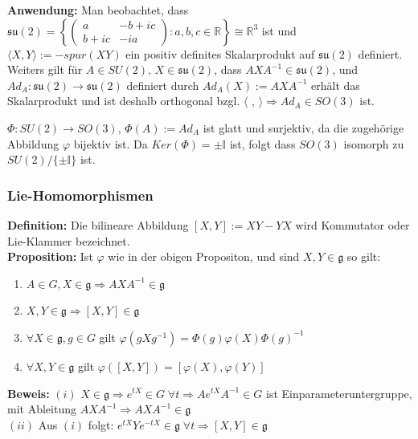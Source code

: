 \documentclass[11pt]{beamer}
\begin{document}
\begin{frame}
	\textbf{Anwendung:} 
	Man beobachtet, dass $\mathfrak{su(2)} = \left\{ \left( \begin{matrix}
	a  	& -b+ic\\
	b+ic	& -ia
	\end{matrix}\right): a,b,c \in \mathbb{R} \right\} \cong \mathbb{R}^3$ 
	ist \pause
	und 
	$\langle X, Y \rangle:= -spur(XY)$ ein positiv definites Skalarprodukt auf $\mathfrak{su(2)}$\pause 
	definiert.
	Weiters gilt für $A\in SU(2)$, $X\in \mathfrak{su(2)}$, dass $AXA^{-1} \in \mathfrak{su(2)}$,\pause
	 und 
	$Ad_A:\mathfrak{su(2)} \to \mathfrak{su(2)}$ definiert durch $Ad_A(X) := AXA^{-1}$ erhält das Skalarprodukt und ist deshalb orthogonal bzgl. $\langle \,\, , \, \rangle \Rightarrow Ad_A \in SO(3)$ ist. \\ \pause
	
	 
	$\Phi: SU(2) \to SO(3)$, $\Phi(A) := Ad_A$ ist glatt und surjektiv, da die zugehörige Abbildung $\varphi$ bijektiv ist. \pause
	Da $Ker(\Phi) = {\pm \mathbb{I}}$ ist, folgt dass $SO(3)$ isomorph zu $SU(2)/\{\pm\mathbb{I}\}$ ist.
	
\end{frame}

\begin{frame}
	\frametitle{Lie-Homomorphismen}
	\textbf{Definition:}
	Die bilineare Abbildung $[X, Y] := XY - YX$ wird Kommutator oder Lie-Klammer bezeichnet.\\[1em] \pause
	\textbf{Proposition:}
	Ist $\varphi$ wie in der obigen Propositon, und sind $X, Y \in \mathfrak{g}$ so gilt: \pause
	\begin{enumerate}[label = $(\roman*)$]
		\item $A\in G, X \in \mathfrak g \Rightarrow AXA^{-1} \in \mathfrak g$ \pause
		
		\item $X, Y \in \mathfrak g \Rightarrow [X,Y] \in \mathfrak g$ \pause
		
		\item $\forall X \in \mathfrak{g}, g\in G$ gilt $\varphi(gXg^{-1}) = \Phi(g) \varphi(X) \Phi(g)^{-1}$ \pause
		
		\item $\forall X, Y \in \mathfrak{g}$ gilt $\varphi([X,Y]) = [\varphi(X), \varphi(Y)]$ \pause
	\end{enumerate}
	
	\textbf{Beweis:}
	$(i)$ $X\in \mathfrak g \Rightarrow e^{tX}\in G\; \forall t \Rightarrow Ae^{tX}A^{-1} \in G$ ist Einparameteruntergruppe, mit Ableitung $AXA^{-1} \Rightarrow AXA^{-1} \in \mathfrak g$ \\[1em]\pause
	$(ii)$ Aus $(i)$ folgt: $e^{tX}Ye^{-tX} \in \mathfrak g\; \forall t \Rightarrow [X,Y] \in \mathfrak g$
	
\end{frame}
\end{document}

